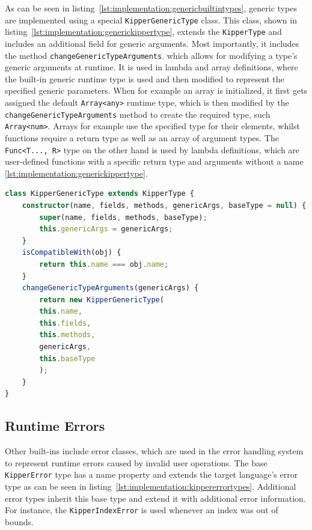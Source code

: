As can be seen in listing~\ref{lst:implementation:genericbuiltintypes}, generic types are implemented using a special \lstinline|KipperGenericType| class. This class, shown in listing~\ref{lst:implementation:generickippertype}, extends the \lstinline|KipperType| and includes an additional field for generic arguments. Most importantly, it includes the method \lstinline|changeGenericTypeArguments|. which allows for modifying a type's generic arguments at runtime. It is used in lambda and array definitions, where the built-in generic runtime type is used and then modified to represent the specified generic parameters. When for example an array is initialized, it first gets assigned the default \lstinline|Array<any>| runtime type, which is then modified by the  \lstinline|changeGenericTypeArguments| method to create the required type, such  \lstinline|Array<num>|. Arrays for example use the specified type for their elements, whilst functions require a return type as well as an array of argument types. The \lstinline|Func<T..., R>| type on the other hand is used by lambda definitions, which are user-defined functions with a specific return type and arguments without a name \ref{lst:implementation:generickippertype}.

\begin{lstlisting}[language=Typescript,caption=Generic Kipper Type,label=lst:implementation:generickippertype]
class KipperGenericType extends KipperType {
	constructor(name, fields, methods, genericArgs, baseType = null) {
		super(name, fields, methods, baseType);
		this.genericArgs = genericArgs;
	}
	isCompatibleWith(obj) {
		return this.name === obj.name;
	}
	changeGenericTypeArguments(genericArgs) {
		return new KipperGenericType(
		this.name,
		this.fields,
		this.methods,
		genericArgs,
		this.baseType
		);
	}
}
\end{lstlisting}

\subsection{Runtime Errors}

Other built-ins include error classes, which are used in the error handling system to represent runtime errors caused by invalid user operations. The base \lstinline|KipperError| type has a name property and extends the target language's error type as can be seen in listing~\ref{lst:implementation:kippererrortypes}. Additional error types inherit this base type and extend it with additional error information. For instance, the  \lstinline|KipperIndexError| is used whenever an index was out of bounds.

